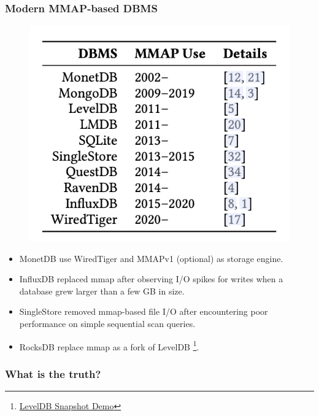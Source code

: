 \documentclass[
	11pt, %
]{beamer}
\begin{document}
\begin{frame}
	\frametitle{Modern MMAP-based DBMS}
	\begin{figure}[h]
		\includegraphics[width=0.35\linewidth]{images/mmap.png}
	\end{figure}
	\pause
	\begin{itemize}
		\item<1-> MonetDB use WiredTiger and MMAPv1 (optional) as storage engine.
		\item<2-> InfluxDB replaced mmap after observing I/O spikes for writes when a database grew larger than a few GB in size.
		\item<3-> SingleStore removed mmap-based file I/O after encountering poor performance on simple sequential scan queries.
		\item<4-> RocksDB replace mmap as a fork of LevelDB
		\footnote[frame]{\href{https://github.com/Ethanzjp/Snippets/tree/master/Level_Snapshot}{LevelDB Snapshot Demo}}.
	\end{itemize}
\end{frame}

\begin{frame}
	\frametitle{What is the truth?}
	\begin{center}
		\fontsize{20pt}{\baselineskip}
	\end{center}
	
\end{frame}
\end{document}
